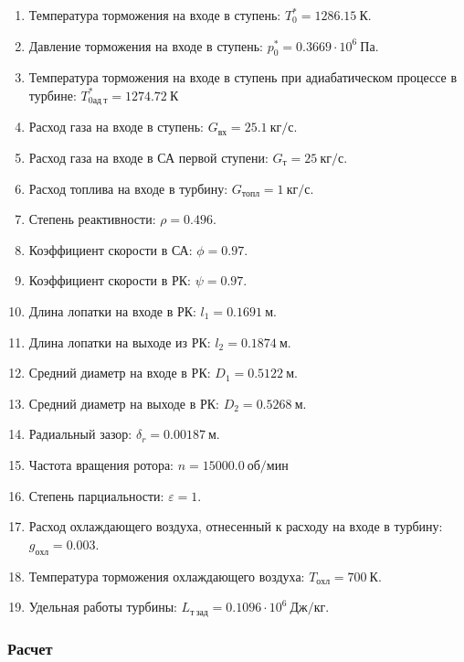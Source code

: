 \documentclass[a4paper,10pt]{article}
\begin{document}
    
    \begin{enumerate}

        \item Температура торможения на входе в ступень: $T_0^* = 1286.15\ К $.
        \item Давление торможения на входе в ступень: $p_0^* = 0.3669 \cdot 10^6 \ Па$.
        \item Температура торможения на входе в ступень при адиабатическом процессе в турбине: $T_{0ад\ т}^* = 1274.72\ К$
        \item Расход газа на входе в ступень: $G_{вх} = 25.1\ кг/с$.
        \item Расход газа на входе в СА первой ступени: $ G_т = 25\ кг/с $.
        \item Расход топлива на входе в турбину: $ G_{топл} = 1\ кг/с $.
        \item Степень реактивности: $ \rho = 0.496 $.
        \item Коэффициент скорости в СА: $ \phi = 0.97 $.
        \item Коэффициент скорости в РК: $ \psi = 0.97 $.
        \item Длина лопатки на входе в РК: $ l_1 = 0.1691\ м $.
        \item Длина лопатки на выходе из РК: $ l_2 = 0.1874\ м $.
        \item Средний диаметр на входе в РК: $ D_1 = 0.5122\ м $.
        \item Средний диаметр на выходе в РК: $ D_2 = 0.5268\ м $.
        \item Радиальный зазор: $ \delta_r = 0.00187\ м $.
        \item Частота вращения ротора: $ n = 15000.0\ об/мин $
        \item Степень парциальности: $ \varepsilon = 1 $.
        \item Расход охлаждающего воздуха, отнесенный к расходу на входе в турбину: $ g_{охл} = 0.003 $.
        \item Температура торможения охлаждающего воздуха: $ T_{охл} = 700\ К $.

        
        \item Удельная работы турбины: $ L_{т\ зад} = 0.1096 \cdot 10^6 \ Дж/кг $.

        

    \end{enumerate}
    

    \subsubsection{Расчет}
\end{document}
